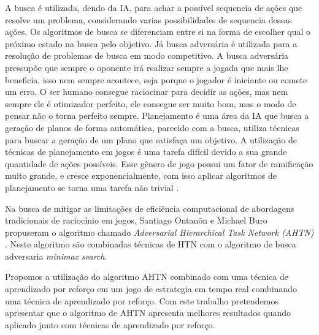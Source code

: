 A busca é utilizada, dendo da IA, para achar a possível sequencia de ações que resolve um problema, considerando varias possibilidades de sequencia dessas ações. Os algoritmos de busca se diferenciam entre si na forma de escolher qual o próximo estado na busca pelo objetivo. Já busca adversária é utilizada para a resolução de problemas de busca em modo competitivo. A busca adversária pressupõe que sempre o oponente irá realizar sempre a jogada que mais lhe beneficia, isso nem sempre acontece, seja porque o jogador é iniciante ou comete um erro. O ser humano consegue raciocinar para decidir as ações, mas nem sempre ele é otimizador perfeito, ele consegue ser muito bom, mas o modo de pensar não o torna perfeito sempre. Planejamento é uma área da IA que busca a geração de planos de forma automática, parecido com a busca, utiliza técnicas para buscar a geração de um plano que satisfaça um objetivo. A utilização de técnicas de planejamento em jogos é uma tarefa difícil devido a sua grande quantidade de ações possíveis. Esse gênero de jogo possui um fator de ramificação muito grande, e cresce exponencialmente, com isso aplicar algoritmos de planejamento se torna uma tarefa não trivial \cite{intelligence2003modern}. 


Na busca de mitigar as limitações de eficiência computacional de abordagens tradicionais de raciocínio em jogos, Santiago Ontanõn e Michael Buro propuseram o algoritmo chamado \textit{Adversarial Hierarchical Task Network (AHTN)} \cite{ontanon2015adversarial}. Neste algoritmo são combinadas técnicas de HTN com o algoritmo de busca adversaria \textit{minimax search}. 

Propomos a utilização do algoritmo AHTN combinado com uma técnica de aprendizado por reforço em um jogo de estrategia em tempo real combinando uma técnica de aprendizado por reforço. Com este trabalho pretendemos apresentar que o algoritmo de AHTN apresenta melhores resultados quando aplicado junto com técnicas de aprendizado por reforço.




